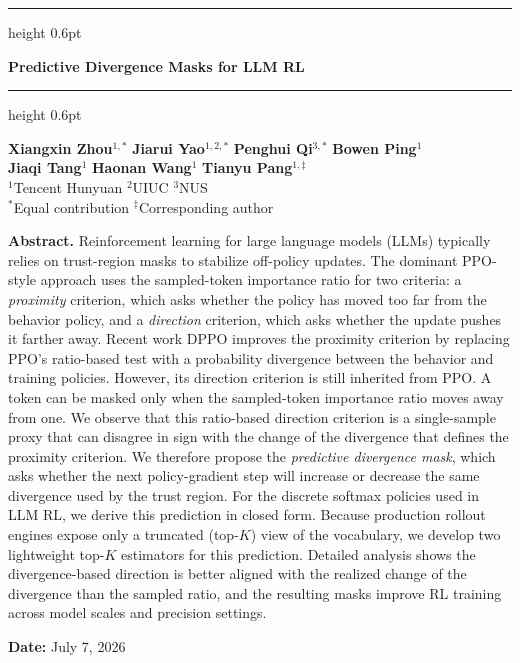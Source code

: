 \documentclass[11pt]{article}
\begin{document}
\thispagestyle{firststyle}
\vspace*{0.25cm}
{\color{hunyuanblue}\hrule height 0.6pt}
\vskip 6mm
\begin{center}
{\LARGE\bfseries Predictive Divergence Masks for LLM RL\par}
\end{center}
\vskip 3mm
{\color{hunyuanblue}\hrule height 0.6pt}
\vskip 6mm
\begin{center}
\textbf{Xiangxin Zhou}$^{1,*}$ \quad
\textbf{Jiarui Yao}$^{1,2,*}$ \quad
\textbf{Penghui Qi}$^{3,*}$ \quad
\textbf{Bowen Ping}$^{1}$ \\
\textbf{Jiaqi Tang}$^{1}$ \quad
\textbf{Haonan Wang}$^{1}$ \quad
\textbf{Tianyu Pang}$^{1,\ddagger}$
\\[8pt]
$^1$Tencent Hunyuan \quad $^2$UIUC \quad $^3$NUS \\[6pt]
{\small $^*$Equal contribution \quad
$^\ddagger$Corresponding author}
\end{center}
\vskip 6mm

\begin{tcolorbox}[
  colframe=abstractbg,
  colback=abstractbg,
  boxrule=0pt,
  arc=2mm,
  enhanced,
  top=12pt,
  bottom=12pt,
  left=15pt,
  right=15pt,
  width=\textwidth,
]
\textbf{Abstract.}\quad
Reinforcement learning for large language models (LLMs) typically relies on
trust-region masks to stabilize off-policy updates.
The dominant PPO-style approach uses the sampled-token importance ratio for two criteria: a \emph{proximity} criterion, which asks whether the policy has moved too far from the behavior policy, and a \emph{direction} criterion, which asks whether the update pushes it farther away.
Recent work DPPO improves the proximity criterion by replacing PPO's ratio-based test with a probability divergence between the behavior and training policies.
However, its direction criterion is still inherited from PPO.
A token can be masked only when the sampled-token importance ratio moves away from one.
We observe that this ratio-based direction criterion is a single-sample proxy that can disagree in sign with the change of the divergence that defines the proximity criterion. 
We therefore propose the \emph{predictive divergence mask}, which asks whether
the next policy-gradient step will increase or decrease the same divergence used
by the trust region. For the discrete softmax policies used in LLM RL, 
we derive this prediction in closed form. Because production rollout engines expose only a truncated (top-$K$) view of the vocabulary, we develop two lightweight top-$K$ estimators for this prediction.
Detailed analysis shows the
divergence-based direction is better aligned with the realized change of the divergence
than the sampled ratio, and the resulting masks improve RL 
training across model scales and precision settings.

\vskip 8pt
\textbf{Date:} July 7, 2026 
\end{tcolorbox}
\end{document}

